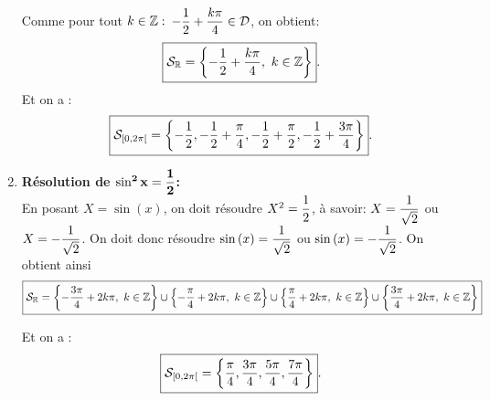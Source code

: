 \documentclass[a4paper, 11pt]{article}
\begin{document}
\begin{correction}
\begin{enumerate}
\begin{minipage}[c]{0.45\textwidth}
Comme pour tout $k\in\mathbb{Z}:$ $-\displaystyle\frac{1}{2}+\displaystyle\frac{k\pi}{4}\in\mathcal{D}$, on obtient:
$$\fbox{$\mathcal{S}_{\mathbb{R}}=\left\lbrace -\displaystyle\frac{1}{2}+\displaystyle\frac{k\pi}{4},\ k\in\mathbb{Z}\right\rbrace$}.$$
Et on a :
$$\fbox{$\mathcal{S}_{[0,2\pi[}=\left\{ - \displaystyle\frac{1}{2}, - \displaystyle\frac{1}{2}+\displaystyle\frac{\pi}{4},  - \displaystyle\frac{1}{2}+\displaystyle\frac{\pi}{2},  - \displaystyle\frac{1}{2}+\displaystyle\frac{3\pi}{4} \right\}$}.$$
\end{minipage}
\quad \begin{minipage}[c]{0.45\textwidth}
\begin{center}
\end{center}
\end{minipage}
\item \textbf{R\'esolution de $\mathbf{\sin^2{x}=\displaystyle\frac{1}{2}}$:}\\
\noindent  En posant $X=\sin{(x)}$, on doit r\'esoudre $X^2=\displaystyle\frac{1}{2}$, \`{a} savoir: $X=\displaystyle\frac{1}{\sqrt{2}}$ ou $X=-\displaystyle\frac{1}{\sqrt{2}}$. On doit donc r\'esoudre $\sin{(x)}=\displaystyle\frac{1}{\sqrt{2}}$ ou $\sin{(x)}=-\displaystyle\frac{1}{\sqrt{2}}$. On obtient ainsi
$$\fbox{$\mathcal{S}_{\R}=\left\lbrace  -\ddp\frac{3\pi}{4}+2k\pi,\ k\in\Z \right\rbrace \cup\left\lbrace  -\ddp\frac{\pi}{4}+2k\pi,\ k\in\Z \right\rbrace \cup\left\lbrace  \ddp\frac{\pi}{4}+2k\pi,\ k\in\Z \right\rbrace \cup\left\lbrace  \ddp\frac{3\pi}{4}+2k\pi,\ k\in\Z \right\rbrace$}$$
\begin{minipage}[c]{0.45\textwidth}
Et on a :
$$\fbox{$ \mathcal{S}_{\lbrack 0,2\pi\lbrack}=\left\lbrace \displaystyle\frac{\pi}{4},\displaystyle\frac{3\pi}{4},\displaystyle\frac{5\pi}{4},\displaystyle\frac{7\pi}{4}  \right\rbrace$}.$$
\end{minipage}
\quad \begin{minipage}[c]{0.45\textwidth}
\begin{center}

\end{center}
\end{minipage}
\end{enumerate}
\end{correction}
\end{document}
